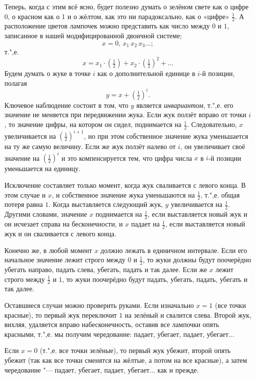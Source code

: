 \documentclass[twoside]{book}
\begin{document}
Теперь, когда с этим всё ясно, будет полезно думать о зелёном свете как о цифре 0, о красном как о 1 и о жёлтом, как это ни парадоксально, как о «цифре» $\tfrac12$.
А расположение цветов лампочек можно представить как число между $0$ и $1$, записанное в нашей модифицированной двоичной системе;
\[x = 0{,}\,x_1\,x_2\,x_3\dots;\]
т.",е.
 \[x = x_1\cdot(\tfrac12)+x_2\cdot(\tfrac12)^2+\dots\]
Будем думать о жуке в точке $i$ как о дополнительной единице в $i$-й позиции, 
полагая
\[y=x+(\tfrac12)^i.\]
Ключевое наблюдение состоит в том, что $y$ является \emph{инвариантом}, т.",е. его значение не меняется при передвижении жука.
Если жук ползёт вправо от точки $i$, то значение цифры, на котором он сидел, поднимается на $\tfrac12$.
Следовательно, $x$ увеличивается на $(\tfrac12)^{i+1}$, но при этом собственное значение жука уменьшается на ту же самую величину.
Если же жук ползёт налево от $i$, он увеличивает своё значение на $(\tfrac12)^i$ и это компенсируется тем, что цифра числа $x$ в $i$-й позиции уменьшается на единицу.

Исключение составляет только момент, когда жук сваливается с левого конца.
В этом случае и $x$, и собственное значение жука уменьшаются на $\tfrac12$, т.",е. общая потеря равна $1$.
Когда выставляется следующий жук, $y$ увеличивается на $\tfrac12$.
Другими словами, значение $x$ поднимается на $\tfrac12$, если выставляется новый жук и он исчезает справа на бесконечности, и $x$ падает на $\tfrac12$, если выставляется новый жук и он сваливается с левого конца.

Конечно же, в любой момент $x$ должно лежать в единичном интервале.
Если его начальное значение лежит строго между $0$ и $\tfrac12$, то жуки должны будут поочерёдно убегать направо, падать слева, убегать, падать и так далее.
Если же $x$ лежит строго между $\tfrac12$ и $1$, то жуки поочерёдно будут падать, убегать, падать, убегать и так далее.

Оставшиеся случаи можно проверить руками.
Если изначально $x = 1$ (все точки красные), то первый жук переключит $1$ на зелёный и свалится слева.
Второй жук, вихляя, удаляется вправо на\pagebreak[3] бесконечность, оставив все лампочки опять красными, т.",е. мы получим чередование: падает, убегает, падает, убегает...

Если $x = 0$ (т.",е. все точки зелёные), то первый жук убежит, второй опять убежит (так как все точки сменятся на жёлтые, а потом на все красные), а затем чередование "--- падает, убегает, падает, убегает... как и прежде.
\end{document}
